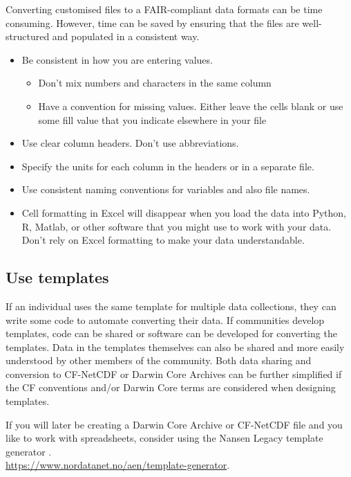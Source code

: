 \documentclass[a4paper,12pt]{article}
\begin{document}
Converting customised files to a FAIR-compliant data formats can be time consuming. However, time can be saved by ensuring that the files are well-structured and populated in a consistent way.

\begin{itemize}
\item Be consistent in how you are entering values.
\begin{itemize}
\item Don't mix numbers and characters in the same column
\item Have a convention for missing values. Either leave the cells blank or use some fill value that you indicate elsewhere in your file
\end{itemize}
\item Use clear column headers. Don't use abbreviations.
\item Specify the units for each column in the headers or in a separate file.
\item Use consistent naming conventions for variables and also file names.
\item Cell formatting in Excel will disappear when you load the data into Python, R, Matlab, or other software that you might use to work with your data. Don't rely on Excel formatting to make your data understandable.
\end{itemize}

\subsection{Use templates}

If an individual uses the same template for multiple data collections, they can write some code to automate converting their data. If communities develop templates, code can be shared or software can be developed for converting the templates. Data in the templates themselves can also be shared and more easily understood by other members of the community. Both data sharing and conversion to CF-NetCDF or Darwin Core Archives can be further simplified if the CF conventions and/or Darwin Core terms are considered when designing templates.

If you will later be creating a Darwin Core Archive or CF-NetCDF file and you like to work with spreadsheets, consider using the Nansen Legacy template generator \citep{templategenerator, marsden2024nansen}.\\
\url{https://www.nordatanet.no/aen/template-generator}.\\
\end{document}

